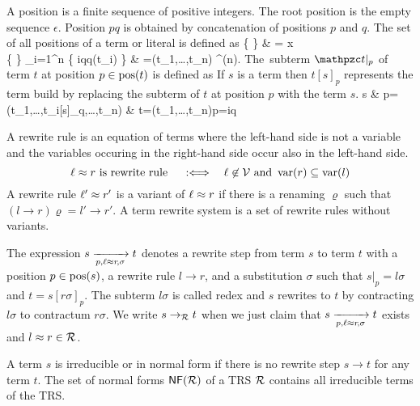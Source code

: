 \begin{definition}\label{def:position}
	A {\myem position} is a finite sequence of positive integers.
	The root position is the empty sequence $\epsilon$.
	Position $pq$ is obtained by concatenation of positions $p$ and $q$.
	The set of all positions of a term or literal is defined as 
	\DEFINE{ 
		\pos(\mct) }
	{
		\{ \epsilon \} 		
		& \mct = x \in \mcV \\
%		
		\{ \epsilon \} \cup \bigcup_{i=1}^{n} \{ iq\mid q\in\pos(t_i) \}	
		& \mct=\mcf(t_1,\ldots,t_n) \mcf\in\mcF^{(n)}.
	}
The~{\myem subterm} $\mct|_p$ of term $t$ {\myem at position} $p\in\operatorname{pos}(t)$ is defined as
%
%
If $s$ is a term then $t[s]_p$ represents the term build by replacing the subterm of $t$ at position $p$ with the term $s$.
{
	s 		& p=\epsilon \\
	\mf(t_1,\ldots,t_i[s]_q,\ldots,t_n)	& t=\mf(t_1,\ldots,t_n)p=iq
}
\end{definition}

\begin{definition}
	A {\myem rewrite rule} is an equation of terms where the left-hand side is not a variable
	and the variables occuring in the right-hand side occur also in the left-hand side.
	\[
		\ell\approx r \text{ is rewrite rule }\quad :\Longleftrightarrow\quad\ell\not\in{\mathcal V}\text{ and }\operatorname{var}(r)\subseteq\operatorname{var}(l)
	\] 
	A rewrite rule $\ell'\approx r'$ is a {\myem variant} of $\ell\approx r$ if there is a renaming $\varrho$
	such that 
	$(l\rightarrow r)\varrho = l'\rightarrow r'$.
	A {\myem term rewrite system} is a set of rewrite rules without variants.
	
	The expression $s\xrightarrow[{p,\ell\approx r\!,\sigma}]{}t$ denotes a {\myem rewrite step} 
	from term $s$ to term $t$
	with 
	a position $p\in\operatorname{pos}(s)$,
	a rewrite rule $l\rightarrow r$,
	and a substitution $\sigma$ such that
	$s|_p=l\sigma$ and $t=s[r\sigma]_p$.
	The subterm $l\sigma$ is called {\myem redex} and
	$s$ rewrites to $t$ by {\myem contracting} $l\sigma$ to {\myem contractum} $r\sigma$.
	We write $s\rightarrow_{\mathcal R} t$ when we just claim that $s\xrightarrow[{p,\ell\approx r\!, \sigma}]{}t$ exists and $l\approx r\in{\mathcal R}$.
	
	
	A term $s$ is {\myem irreducible} or in {\myem normal form} if there is no rewrite step $s\rightarrow t$ for any term $t$. 
	The set of normal forms $\mathsf{NF}({\mathcal R})$ of a TRS ${\mathcal R}$ contains all irreducible terms of the TRS.
	\end{definition}
